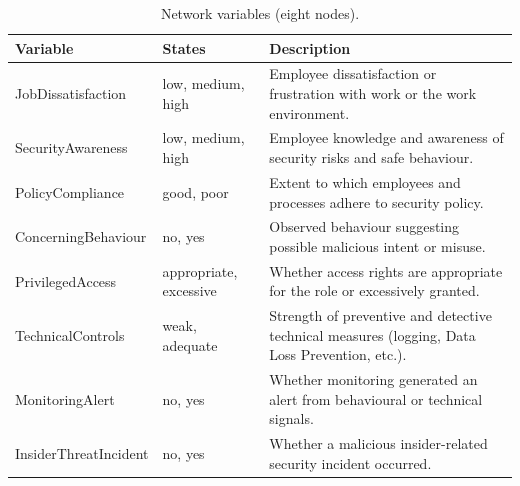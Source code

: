 \documentclass[11pt,a4paper]{article}
\begin{document}
\begin{table}[H]
\centering
\scriptsize
\caption{Network variables (eight nodes).}
\label{tab:variables}
\begin{tabular}{@{}llp{4.8cm}@{}}
\toprule
Variable & States & Description \\
\midrule
JobDissatisfaction & low, medium, high & Employee dissatisfaction or frustration with work or the work environment. \\
SecurityAwareness & low, medium, high & Employee knowledge and awareness of security risks and safe behaviour. \\
PolicyCompliance & good, poor & Extent to which employees and processes adhere to security policy. \\
ConcerningBehaviour & no, yes & Observed behaviour suggesting possible malicious intent or misuse. \\
PrivilegedAccess & appropriate, excessive & Whether access rights are appropriate for the role or excessively granted. \\
TechnicalControls & weak, adequate & Strength of preventive and detective technical measures (logging, Data Loss Prevention, etc.). \\
MonitoringAlert & no, yes & Whether monitoring generated an alert from behavioural or technical signals. \\
InsiderThreatIncident & no, yes & Whether a malicious insider-related security incident occurred. \\
\bottomrule
\end{tabular}
\end{table}
\end{document}
